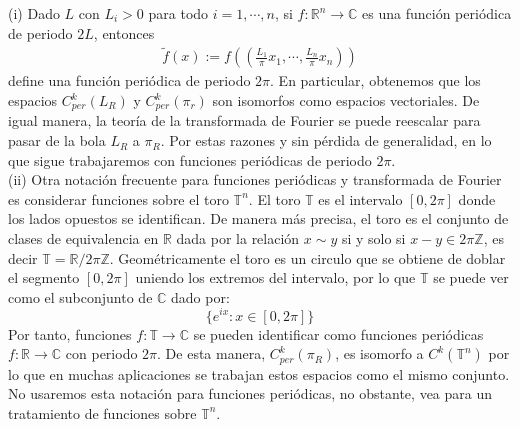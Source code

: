     \begin{note}\label{note:funcion-de-periodo-2pi}
      (i) Dado $L$ con $L_i>0$ para todo $i=1,\cdots,n$, si $f:\mathbb{R}^{n}\rightarrow\mathbb{C}$ es una función periódica de periodo $2L$, entonces\\
      \begin{align*}
        \tilde{f}(x):=f\left( \left( \frac{L_1}{\pi}x_1,\cdots,\frac{L_n}{\pi}x_n \right) \right)
      \end{align*}
      define una función periódica de periodo $2\pi$. En particular, obtenemos que los espacios $C_{per}^{k}(L_R)$ y $C_{per}^{k}(\pi_r)$ son isomorfos como espacios vectoriales. De igual manera, la teoría de la transformada de Fourier se puede reescalar para pasar de la bola $L_R$ a $\pi_R$. Por estas razones y sin pérdida de generalidad, en lo que sigue trabajaremos con funciones periódicas de periodo $2\pi$.\\
      (ii) Otra notación frecuente para funciones periódicas y transformada de Fourier es considerar funciones sobre el toro $\mathbb{T}^{n}$. El toro $\mathbb{T}$ es el intervalo $[0,2\pi]$ donde los lados opuestos se identifican. De manera más precisa, el toro es el conjunto de clases de equivalencia en $\mathbb{R}$ dada por la relación $x\sim y$ si y solo si $x-y \in 2\pi\mathbb{Z}$, es decir $\mathbb{T}=\mathbb{R}/2\pi\mathbb{Z}$. Geométricamente el toro es un circulo que se obtiene de doblar el segmento $[0,2\pi]$ uniendo los extremos del intervalo, por lo que $\mathbb{T}$ se puede ver como el subconjunto de $\mathbb{C}$ dado por:
      $$\{e^{ix}:x\in[0,2\pi]\}$$
      Por tanto, funciones $f: \mathbb{T}\rightarrow\mathbb{C}$ se pueden identificar como funciones periódicas $f:\mathbb{R}\rightarrow\mathbb{C}$ con periodo $2\pi$. De esta manera, $C_{per}^{k}(\pi_R)$, es isomorfo a $C^{k}(\mathbb{T}^n)$ por lo que en muchas aplicaciones se trabajan estos espacios como el mismo conjunto. No usaremos esta notación para funciones periódicas, no obstante, vea \cite{MR3243734} para un tratamiento de funciones sobre $\mathbb{T}^n$.
    \end{note}
